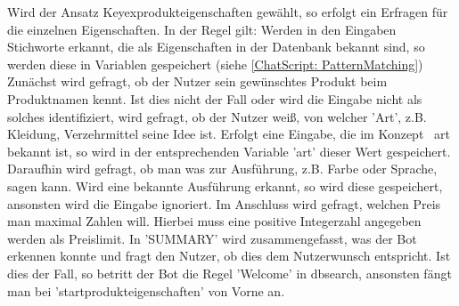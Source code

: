 Wird der Ansatz Keyexprodukteigenschaften gewählt, so erfolgt ein Erfragen für die einzelnen Eigenschaften. In der Regel gilt: Werden in den Eingaben Stichworte erkannt, die als Eigenschaften in der Datenbank bekannt sind, so werden diese in Variablen gespeichert (siehe \ref{ChatScript: PatternMatching}) Zunächst wird gefragt, ob der Nutzer sein gewünschtes Produkt beim Produktnamen kennt. Ist dies nicht der Fall oder wird die Eingabe nicht als solches identifiziert, wird gefragt, ob der Nutzer weiß, von welcher 'Art', z.B. Kleidung, Verzehrmittel seine Idee ist. Erfolgt eine Eingabe, die im Konzept ~art bekannt ist, so wird in der entsprechenden Variable 'art' dieser Wert gespeichert. 
Daraufhin wird gefragt, ob man was zur Ausführung, z.B. Farbe oder Sprache, sagen kann. Wird eine bekannte Ausführung erkannt, so wird diese gespeichert, ansonsten wird die Eingabe ignoriert. 
Im Anschluss wird gefragt, welchen Preis man maximal Zahlen will. Hierbei muss eine positive Integerzahl angegeben werden als Preislimit. 
In 'SUMMARY' wird zusammengefasst, was der Bot erkennen konnte und fragt den Nutzer, ob dies dem Nutzerwunsch entspricht. Ist dies der Fall, so betritt der Bot die Regel 'Welcome' in dbsearch, ansonsten fängt man bei 'startprodukteigenschaften' von Vorne an. 



